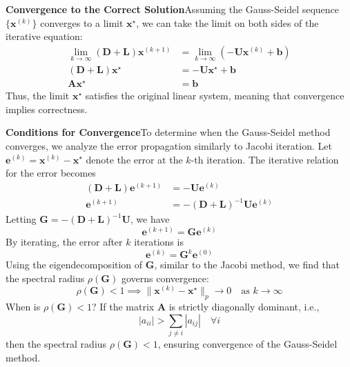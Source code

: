 \textbf{Convergence to the Correct Solution}\quad Assuming the Gauss-Seidel sequence $\{\mathbf{x}^{(k)}\}$ converges to a limit $\mathbf{x}^\star$, we can take the limit on both sides of the iterative equation:
\begin{align*}
    \lim_{k \to \infty} (\mathbf{D} + \mathbf{L})\mathbf{x}^{(k+1)} &= \lim_{k \to \infty} \left( -\mathbf{U}\mathbf{x}^{(k)} + \mathbf{b} \right) \\
    (\mathbf{D} + \mathbf{L})\mathbf{x}^\star &= -\mathbf{U}\mathbf{x}^\star + \mathbf{b} \\
    \mathbf{A}\mathbf{x}^\star &= \mathbf{b}
\end{align*}
Thus, the limit $\mathbf{x}^\star$ satisfies the original linear system, meaning that convergence implies correctness.

\textbf{Conditions for Convergence}\quad To determine when the Gauss-Seidel method converges, we analyze the error propagation similarly to Jacobi iteration. Let $\mathbf{e}^{(k)} = \mathbf{x}^{(k)} - \mathbf{x}^\star$ denote the error at the $k$-th iteration. The iterative relation for the error becomes
\begin{align*}
    (\mathbf{D} + \mathbf{L})\mathbf{e}^{(k+1)} &= -\mathbf{U}\mathbf{e}^{(k)} \\
    \mathbf{e}^{(k+1)} &= -(\mathbf{D} + \mathbf{L})^{-1}\mathbf{U}\mathbf{e}^{(k)}
\end{align*}
Letting $\mathbf{G} = -(\mathbf{D} + \mathbf{L})^{-1}\mathbf{U}$, we have
\begin{equation*}
    \mathbf{e}^{(k+1)} = \mathbf{G}\mathbf{e}^{(k)}
\end{equation*}
By iterating, the error after $k$ iterations is
\begin{equation*}
    \mathbf{e}^{(k)} = \mathbf{G}^k \mathbf{e}^{(0)}
\end{equation*}
Using the eigendecomposition of $\mathbf{G}$, similar to the Jacobi method, we find that the spectral radius $\rho(\mathbf{G})$ governs convergence:
\begin{equation*}
    \rho(\mathbf{G}) < 1 \implies \|\mathbf{x}^{(k)} - \mathbf{x}^\star\|_p \to 0 \quad \text{as } k \to \infty
\end{equation*}
When is $\rho(\mathbf{G}) < 1$? If the matrix $\mathbf{A}$ is strictly diagonally dominant, i.e.,
\begin{equation*}
    |a_{ii}| > \sum_{j \neq i} |a_{ij}| \quad \forall i
\end{equation*}
then the spectral radius $\rho(\mathbf{G}) < 1$, ensuring convergence of the Gauss-Seidel method.

